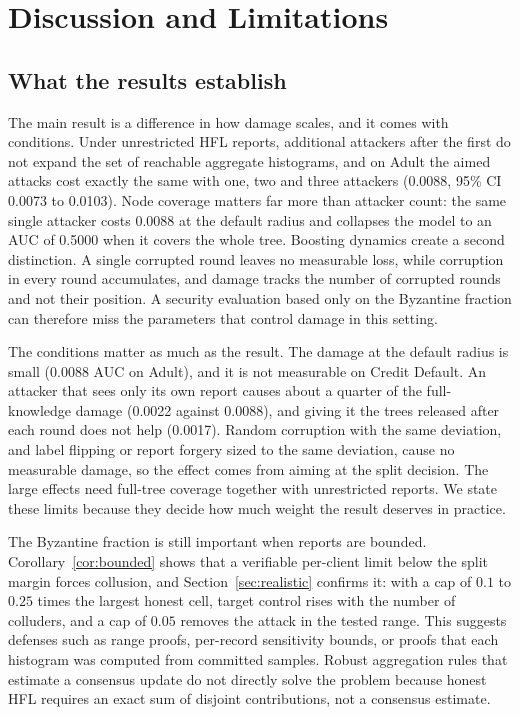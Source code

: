 \documentclass[11pt]{article}
\newcommand{\rev}[1]{#1}
\begin{document}
\FloatBarrier

\section{Discussion and Limitations}
\label{sec:discussion}

\subsection{What the results establish}

\rev{The main result is a difference in how damage scales, and it comes with conditions. Under unrestricted HFL reports, additional attackers after the first do not expand the set of reachable aggregate histograms, and on Adult the aimed attacks cost exactly the same with one, two and three attackers (0.0088, 95\% CI 0.0073 to 0.0103). Node coverage matters far more than attacker count: the same single attacker costs 0.0088 at the default radius and collapses the model to an AUC of 0.5000 when it covers the whole tree. Boosting dynamics create a second distinction. A single corrupted round leaves no measurable loss, while corruption in every round accumulates, and damage tracks the number of corrupted rounds and not their position. A security evaluation based only on the Byzantine fraction can therefore miss the parameters that control damage in this setting.}

\rev{The conditions matter as much as the result. The damage at the default radius is small (0.0088 AUC on Adult), and it is not measurable on Credit Default. An attacker that sees only its own report causes about a quarter of the full-knowledge damage (0.0022 against 0.0088), and giving it the trees released after each round does not help (0.0017). Random corruption with the same deviation, and label flipping or report forgery sized to the same deviation, cause no measurable damage, so the effect comes from aiming at the split decision. The large effects need full-tree coverage together with unrestricted reports. We state these limits because they decide how much weight the result deserves in practice.}

The Byzantine fraction is still important when reports are bounded. Corollary~\ref{cor:bounded} shows that a verifiable per-client limit below the split margin forces collusion\rev{, and Section~\ref{sec:realistic} confirms it: with a cap of $0.1$ to $0.25$ times the largest honest cell, target control rises with the number of colluders, and a cap of $0.05$ removes the attack in the tested range}. This suggests defenses such as range proofs, per-record sensitivity bounds, or proofs that each histogram was computed from committed samples. Robust aggregation rules that estimate a consensus update do not directly solve the problem because honest HFL requires an exact sum of disjoint contributions, not a consensus estimate.
\end{document}
